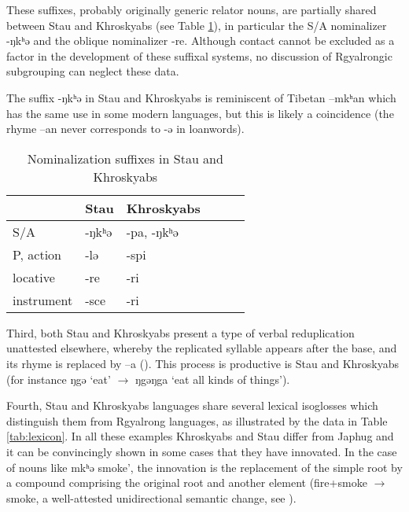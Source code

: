\documentclass[oneside,a4paper,11pt]{article}
\newcommand{\ipa}[1]{{\phon #1}} %
\begin{document}
 These suffixes, probably originally generic relator nouns, are partially shared between Stau and Khroskyabs (see Table \ref{tab:nmlz}), in particular the S/A nominalizer \ipa{-ŋkʰə} and the oblique nominalizer \ipa{-re}. Although contact cannot be excluded as a factor in the development of these suffixal systems, no discussion of Rgyalrongic subgrouping can neglect these data. 
 
 The suffix \ipa{-ŋkʰə}  in Stau and Khroskyabs is reminiscent of Tibetan \ipa{--mkʰan} which has the same use in some modern languages, but this is likely a coincidence (the rhyme \ipa{--an} never corresponds to \ipa{-ə} in loanwords).
 
 
 
 
  \begin{table}[h]
  \caption{Nominalization suffixes in Stau and Khroskyabs} \label{tab:nmlz} \centering
 \begin{tabular}{llllll}
 \toprule
 &	Stau &	Khroskyabs &	\\	
 \midrule
S/A &	\ipa{-ŋkʰə} &	\ipa{-pa, -ŋkʰə} &	\\
P, action &	\ipa{-lə} &	\ipa{-spi} &	\\
locative &	\ipa{-re} &	\ipa{-ri} &	\\
instrument &	\ipa{-sce} &	\ipa{-ri} &	\\
\bottomrule
\end{tabular}
\end{table}

Third, both Stau and Khroskyabs present a type of verbal reduplication unattested elsewhere, whereby the replicated syllable appears after the base, and its rhyme is replaced by \ipa{--a} (\citealt{lai13fuyin}). This process is productive is Stau and Khroskyabs (for instance \ipa{ŋgə} `eat' $\rightarrow$ \ipa{ŋgəŋga} `eat all kinds of things').
 
 
 Fourth, Stau and Khroskyabs languages share several lexical isoglosses which distinguish them from Rgyalrong languages, as illustrated by the data in Table \ref{tab:lexicon}. In all these examples Khroskyabs and Stau differ from Japhug and it can be convincingly shown in some cases that they have innovated. In the case of nouns like \ipa{mkʰə}  smoke', the innovation is the replacement of the simple root by a compound comprising the original root and another element (fire+smoke $\rightarrow$ smoke, a well-attested unidirectional semantic change, see \citealt{urban11semantic}).
\end{document}
